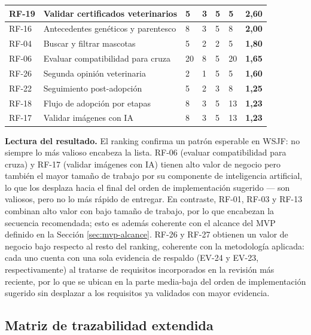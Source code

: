 \documentclass[journal,onecolumn]{IEEEtran}
\begin{document}
\begin{longtable}{@{}p{1.4cm} p{5.4cm} p{1.5cm} p{1.5cm} p{1.5cm} p{1.5cm} p{1.3cm}@{}}
		\hline
		RF-19 & Validar certificados veterinarios & 5 & 3 & 5 & 5 & \textbf{2,60} \\
		\hline
		RF-16 & Antecedentes genéticos y parentesco & 8 & 3 & 5 & 8 & \textbf{2,00} \\
		\hline
		RF-04 & Buscar y filtrar mascotas & 5 & 2 & 2 & 5 & \textbf{1,80} \\
		\hline
		RF-06 & Evaluar compatibilidad para cruza & 20 & 8 & 5 & 20 & \textbf{1,65} \\
		\hline
		RF-26 & Segunda opinión veterinaria & 2 & 1 & 5 & 5 & \textbf{1,60} \\
		\hline
		RF-22 & Seguimiento post-adopción & 5 & 2 & 3 & 8 & \textbf{1,25} \\
		\hline
		RF-18 & Flujo de adopción por etapas & 8 & 3 & 5 & 13 & \textbf{1,23} \\
		\hline
		RF-17 & Validar imágenes con IA & 8 & 3 & 5 & 13 & \textbf{1,23} \\
	\end{longtable}
	
	\textbf{Lectura del resultado.} El ranking confirma un patrón esperable en
	WSJF: no siempre lo más valioso encabeza la lista. RF-06 (evaluar
	compatibilidad para cruza) y RF-17 (validar imágenes con IA) tienen alto
	valor de negocio pero también el mayor tamaño de trabajo por su componente
	de inteligencia artificial, lo que los desplaza hacia el final del orden de
	implementación sugerido --- son valiosos, pero no lo más rápido de
	entregar. En contraste, RF-01, RF-03 y RF-13 combinan alto valor con bajo
	tamaño de trabajo, por lo que encabezan la secuencia recomendada; esto es
	además coherente con el alcance del MVP definido en la Sección
	\ref{sec:mvp-alcance}. RF-26 y RF-27 obtienen un valor de negocio bajo
	respecto al resto del ranking, coherente con la metodología aplicada: cada
	uno cuenta con una sola evidencia de respaldo (EV-24 y EV-23,
	respectivamente) al tratarse de requisitos incorporados en la revisión más
	reciente, por lo que se ubican en la parte media-baja del orden de
	implementación sugerido sin desplazar a los requisitos ya validados con
	mayor evidencia.
	
	\subsection{Matriz de trazabilidad extendida}
	\label{sec:trazabilidad}
	
\end{document}
